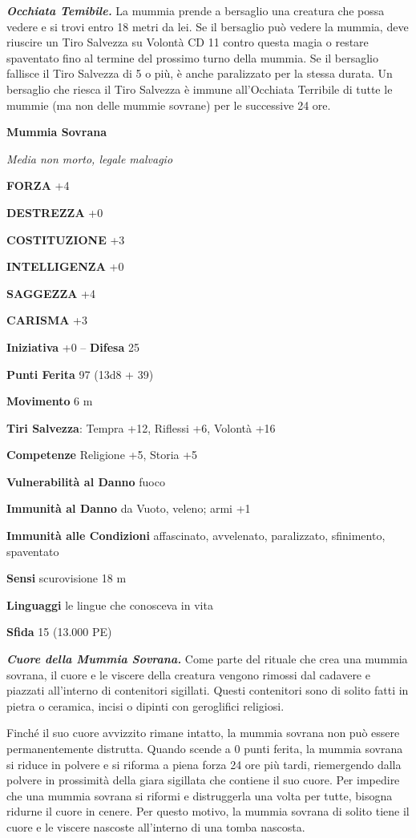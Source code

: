 \begin{multicols}{2}
\emph{\textbf{Occhiata Temibile.}} La mummia prende a bersaglio una creatura che possa vedere e si trovi entro 18 metri da lei. Se il bersaglio può vedere la mummia, deve riuscire un Tiro Salvezza su Volontà CD 11 contro questa magia o restare spaventato fino al termine del prossimo turno della mummia. Se il bersaglio fallisce il Tiro Salvezza di 5 o più, è anche paralizzato per la stessa durata. Un bersaglio che riesca il Tiro Salvezza è immune all'Occhiata Terribile di tutte le mummie (ma non delle mummie sovrane) per le successive 24 ore.

\medskip{}\textbf{Mummia Sovrana}

\emph{Media non morto, legale malvagio}

\textbf{FORZA} +4

\textbf{DESTREZZA} +0

\textbf{COSTITUZIONE} +3

\textbf{INTELLIGENZA} +0

\textbf{SAGGEZZA} +4

\textbf{CARISMA} +3

\textbf{Iniziativa} +0 -- \textbf{Difesa} 25

\textbf{Punti Ferita} 97 (13d8 + 39)

\textbf{Movimento} 6 m

\textbf{Tiri Salvezza}: Tempra +12, Riflessi +6, Volontà +16

\textbf{Competenze} Religione +5, Storia +5

\textbf{Vulnerabilità al Danno} fuoco

\textbf{Immunità al Danno} da Vuoto, veleno; armi +1

\textbf{Immunità alle Condizioni} affascinato, avvelenato, paralizzato,
sfinimento, spaventato

\textbf{Sensi} scurovisione 18 m

\textbf{Linguaggi} le lingue che conosceva in vita

\textbf{Sfida} 15 (13.000 PE)

\emph{\textbf{Cuore della Mummia Sovrana.}} Come parte del rituale che crea una mummia sovrana, il cuore e le viscere della creatura vengono rimossi dal cadavere e piazzati all'interno di contenitori sigillati. Questi contenitori sono di solito fatti in pietra o ceramica, incisi o dipinti con geroglifici religiosi.

Finché il suo cuore avvizzito rimane intatto, la mummia sovrana non può essere permanentemente distrutta. Quando scende a 0 punti ferita, la mummia sovrana si riduce in polvere e si riforma a piena forza 24 ore più tardi, riemergendo dalla polvere in prossimità della giara sigillata che contiene il suo cuore. Per impedire che una mummia sovrana si riformi e distruggerla una volta per tutte, bisogna ridurne il cuore in cenere. Per questo motivo, la mummia sovrana di solito tiene il cuore e le viscere nascoste all'interno di una tomba nascosta.


\end{multicols}
